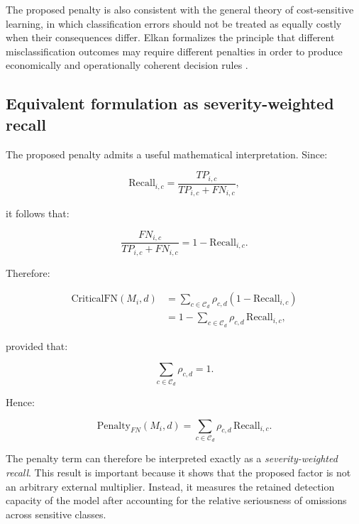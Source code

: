 \documentclass[11pt,a4paper]{article}
\begin{document}
The proposed penalty is also consistent with the general theory of cost-sensitive learning, in which classification errors should not be treated as equally costly when their consequences differ. Elkan formalizes the principle that different misclassification outcomes may require different penalties in order to produce economically and operationally coherent decision rules \citep{elkan_2001}.

\subsection{Equivalent formulation as severity-weighted recall}

The proposed penalty admits a useful mathematical interpretation. Since:

\begin{equation}
    \mathrm{Recall}_{i,c}
    =
    \frac{TP_{i,c}}{TP_{i,c}+FN_{i,c}},
\end{equation}

it follows that:

\begin{equation}
    \frac{FN_{i,c}}{TP_{i,c}+FN_{i,c}}
    =
    1-\mathrm{Recall}_{i,c}.
\end{equation}

Therefore:

\begin{equation}
\begin{aligned}
    \mathrm{CriticalFN}(M_i,d)
    &=
    \sum_{c\in\mathcal{C}_d}
    \rho_{c,d}
    \left(
    1-\mathrm{Recall}_{i,c}
    \right) \\
    &=
    1-
    \sum_{c\in\mathcal{C}_d}
    \rho_{c,d}\,
    \mathrm{Recall}_{i,c},
\end{aligned}
\end{equation}

provided that:

\begin{equation}
    \sum_{c\in\mathcal{C}_d}\rho_{c,d}=1.
\end{equation}

Hence:

\begin{equation}
    \mathrm{Penalty}_{FN}(M_i,d)
    =
    \sum_{c\in\mathcal{C}_d}
    \rho_{c,d}\,
    \mathrm{Recall}_{i,c}.
\end{equation}

The penalty term can therefore be interpreted exactly as a \textit{severity-weighted recall}. This result is important because it shows that the proposed factor is not an arbitrary external multiplier. Instead, it measures the retained detection capacity of the model after accounting for the relative seriousness of omissions across sensitive classes.
\end{document}
